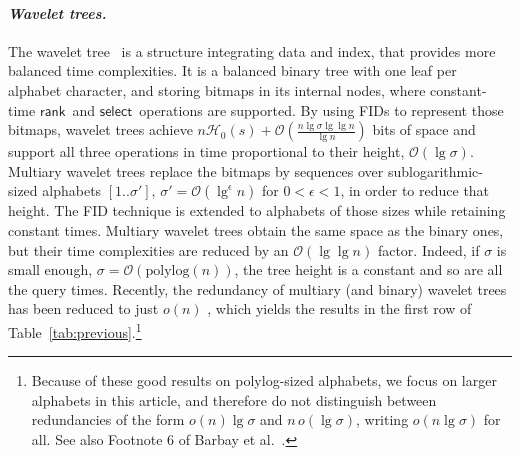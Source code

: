 \documentclass[11pt]{article}
\newcommand{\Oh}[1]
    {\ensuremath{\mathcal{O}\left( {#1} \right)}}
\newcommand{\rank}
    {\ensuremath{\mathsf{rank}}}
\newcommand{\select}
    {\ensuremath{\mathsf{select}}}
\newcommand{\HH}{\mathcal{H}}
\newcommand{\Ho}{\HH_0}
\begin{document}
\paragraph{\em Wavelet trees.}
The wavelet tree~\cite{GGV03} is a structure integrating data and
index, that provides more balanced time complexities.  It is a balanced
binary tree with one leaf per alphabet character, and storing bitmaps
in its internal nodes, where constant-time \rank\ and
\select\ operations are supported. By using FIDs
\cite{RRR02} to represent those bitmaps, wavelet trees achieve
$n\Ho(s) + \Oh{\frac{n\lg\sigma \lg\lg n}{\lg n}}$ bits of space and
support all three operations in time proportional to their height,
$\Oh{\lg\sigma}$. Multiary wavelet trees \cite{FMMN07} replace the
bitmaps by sequences over sublogarithmic-sized alphabets
$[1..\sigma']$, $\sigma'=\Oh{\lg^\epsilon n}$ for $0<\epsilon<1$, in
order to reduce that height. The FID technique is extended to
alphabets of those sizes while retaining constant times.  Multiary
wavelet trees obtain the same space as the binary ones, but their time
complexities are reduced by an $\Oh{\lg\lg n}$ factor. Indeed, if
$\sigma$ is small enough, $\sigma = \Oh{\mathrm{polylog}(n)}$, the
tree height is a constant and so are all the query times. Recently,
the redundancy of multiary (and binary) wavelet trees has been reduced
to just $o(n)$ \cite{GRR08}, which yields the results in the first row
of Table~\ref{tab:previous}.\footnote{Because of these good results on polylog-sized alphabets, we
  focus on larger alphabets in this article, and therefore do not
  distinguish between redundancies of the form $o(n)\lg\sigma$ and
  $n\,o(\lg\sigma)$, writing $o(n\lg\sigma)$ for all. See also
  Footnote 6 of Barbay et al.~\cite{BHMR07}.}
\end{document}
